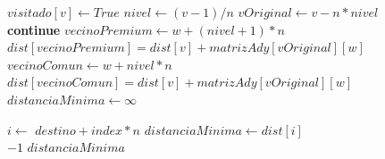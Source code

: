 \begin{algorithm}[H]
\begin{algorithmic}
		\State $visitado[v] \gets True$    
		\State $nivel \gets (v-1)/n$    
		\State $vOriginal \gets v - n * nivel$      \\

		    
			    
				    
					    
						\State \textbf{continue}    
					\EndIf
					\State $vecinoPremium \gets w + (nivel+1) * n$    
					    
						    
							\State $dist[vecinoPremium] = dist[v] + matrizAdy[vOriginal][w]$    
						\EndIf
					\EndIf
				\Else
					\State $vecinoComun \gets w + nivel*n$    
					    
						    
							\State $dist[vecinoComun] = dist[v] + matrizAdy[vOriginal][w]$    
						\EndIf
					\EndIf
				\EndIf
			\EndIf
		\EndFor
	\EndWhile \\

	\State $distanciaMinima \gets \infty$    

	    
		\State $i \gets$ $destino + index * n$ 
		    
			\State $distanciaMinima \gets dist[i]$    
		\EndIf
	\EndFor \\


	    
		\State \Return $-1$    
	\Else
		\State \Return $distanciaMinima$    
	\EndIf
\EndFunction

\end{algorithmic}
\end{algorithm}

